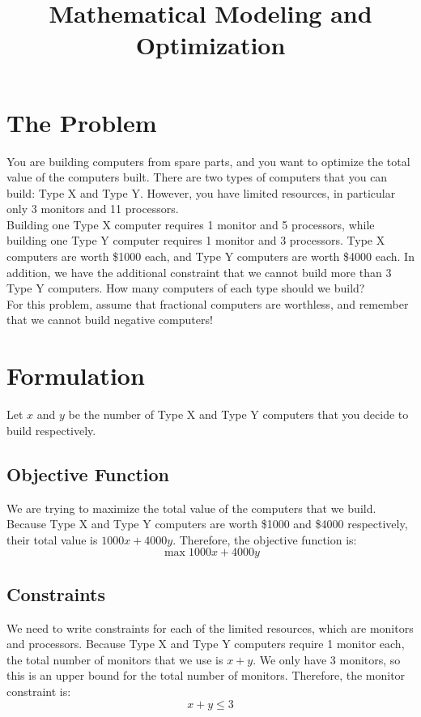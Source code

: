 \documentclass[12pt]{article}
\begin{document}
\title{Mathematical Modeling and Optimization}

\maketitle

\section{The Problem}

You are building computers from spare parts, and you want to optimize the total value of the
computers built.  There are two types of computers that you can build: Type X and Type Y.  However,
you have limited resources, in particular only 3 monitors and 11 processors.  \\

Building one Type X computer requires 1 monitor and 5 processors, while building one Type Y computer
requires 1 monitor and 3 processors.  Type X computers are worth \$1000 each, and Type Y computers are worth
\$4000 each.  In addition, we have the additional constraint that we cannot build more than 3 Type Y computers.  
How many computers of each type should we build? \\

For this problem, assume that fractional computers are worthless, and remember that we cannot build negative computers!  

\section{Formulation}

Let $x$ and $y$ be the number of Type X and Type Y computers that you decide to build respectively.  

\subsection{Objective Function}
We are trying to maximize the total value of the computers that we build.  Because Type X and Type Y computers are
worth \$1000 and \$4000 respectively, their total value is $1000x + 4000y$.  Therefore, the objective function is:
\[
\max 1000x + 4000y
\]

\subsection{Constraints}
We need to write constraints for each of the limited resources, which are monitors and processors.
Because Type X and Type Y computers require 1 monitor each, the total number of monitors that we use
is $x + y$.  We only have 3 monitors, so this is an upper bound for the total number of monitors.  Therefore,
the monitor constraint is:
\[
x + y \leq 3
\]
\end{document}
